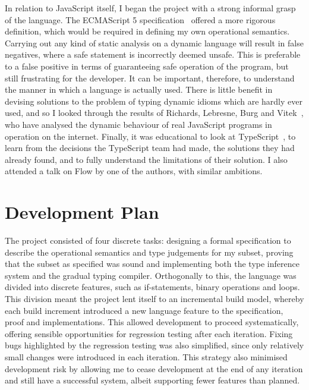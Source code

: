 \documentclass[12pt,a4paper,twoside,openright]{report}
\begin{document}
In relation to JavaScript itself, I began the project with a strong informal
grasp of the language. The ECMAScript 5 specification~\cite{ecmaSpec} offered a
more rigorous definition, which would be required in defining my own
operational semantics. Carrying out any kind of static analysis on a dynamic
language will result in false negatives, where a safe statement is incorrectly
deemed unsafe. This is preferable to a false positive in terms of guaranteeing
safe operation of the program, but still frustrating for the developer. It can
be important, therefore, to understand the manner in which a language is
actually used. There is little benefit in devising solutions to the problem of
typing dynamic idioms which are hardly ever used, and so I looked through the
results of Richards, Lebresne, Burg and Vitek~\cite{JSBehaviour}, who have
analysed the dynamic behaviour of real JavaScript programs in operation on the
internet.  Finally, it was educational to look at
TypeScript~\cite{ts,understandingTS}, to learn from the decisions the
TypeScript team had made, the solutions they had already found, and to fully
understand the limitations of their solution. I also attended a talk on Flow by
one of the authors, with similar ambitions.

\section{Development Plan}

The project consisted of four discrete tasks: designing a formal specification
to describe the operational semantics and type judgements for my subset,
proving that the subset as specified was sound and implementing both the type
inference system and the gradual typing compiler. Orthogonally to this, the
language was divided into discrete features, such as if-statements, binary
operations and loops. This division meant the project lent itself to an
incremental build model, whereby each build increment introduced a new language
feature to the specification, proof and implementations. This allowed
development to proceed systematically, offering sensible opportunities for
regression testing after each iteration. Fixing bugs highlighted by the
regression testing was also simplified, since only relatively small changes
were introduced in each iteration. This strategy also minimised development
risk by allowing me to cease development at the end of any iteration and still
have a successful system, albeit supporting fewer features than planned.
\end{document}
